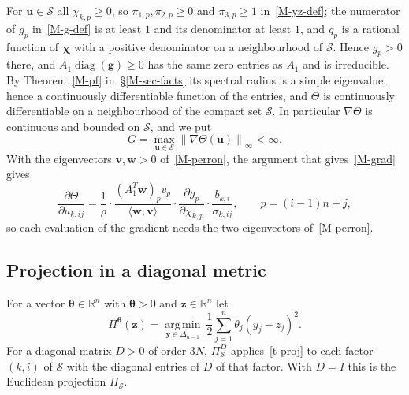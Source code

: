\documentclass[11pt]{article}
\theoremstyle{plain}
\theoremstyle{remark}
\numberwithin{equation}{section}
\begin{document}
For $\bm u\in\mathcal{S}$ all $\chi_{k,p}\ge 0$, so
$\pi_{1,p},\pi_{2,p}\ge 0$ and $\pi_{3,p}\ge 1$ in~\eqref{M-yz-def}; the
numerator of $g_p$ in~\eqref{M-g-def} is at least $1$ and its denominator at least $1$, and $g_p$
is a rational function of $\bm\chi$ with a positive denominator on a
neighbourhood of $\mathcal{S}$. Hence $g_p>0$ there, and
$A_1\operatorname{diag}(\bm g)\ge 0$ has the same zero entries as $A_1$ and is
irreducible. By Theorem~\ref{M-pf} in~\S\ref{M-sec-facts} its spectral radius is a
simple eigenvalue, hence a continuously differentiable function of the
entries, and $\Theta$ is continuously differentiable on a neighbourhood of the
compact set $\mathcal{S}$. In
particular $\nabla\Theta$ is continuous and bounded on $\mathcal{S}$, and we
put
\begin{equation}\label{t-G}
G=\max_{\bm u\in\mathcal{S}}\left\|\nabla\Theta\left(\bm u\right)\right\|_\infty<\infty .
\end{equation}
With the eigenvectors $\bm v,\bm w>0$ of~\eqref{M-perron}, the argument that
gives~\eqref{M-grad} gives
\begin{equation}\label{t-grad}
\frac{\partial\Theta}{\partial u_{k,ij}}
=\frac{1}{\rho}\cdot\frac{\left(A_1^T\bm w\right)_pv_p}{\langle\bm w,\bm v\rangle}
\cdot\frac{\partial g_p}{\partial \chi_{k,p}}\cdot\frac{b_{k,i}}{\sigma_{k,ij}},
\qquad p=(i-1)n+j ,
\end{equation}
so each evaluation of the gradient needs the two eigenvectors of~\eqref{M-perron}.

\subsection{Projection in a diagonal metric}

For a vector $\bm\theta\in\mathbb{R}^n$ with $\bm\theta>0$ and
$\bm z\in\mathbb{R}^n$ let
\begin{equation}\label{t-proj}
\Pi^{\bm\theta}(\bm z)=\operatorname*{arg\,min}_{\bm y\in\Delta_{n-1}}\
\frac12\sum_{j=1}^n \theta_j\left(y_j-z_j\right)^2 .
\end{equation}
For a diagonal matrix $D>0$ of order $3N$, $\Pi^D_{\mathcal{S}}$
applies~\eqref{t-proj} to each factor $(k,i)$ of $\mathcal{S}$ with the
diagonal entries of $D$ of that factor. With $D=I$ this is the Euclidean
projection $\Pi_{\mathcal{S}}$.
\end{document}
